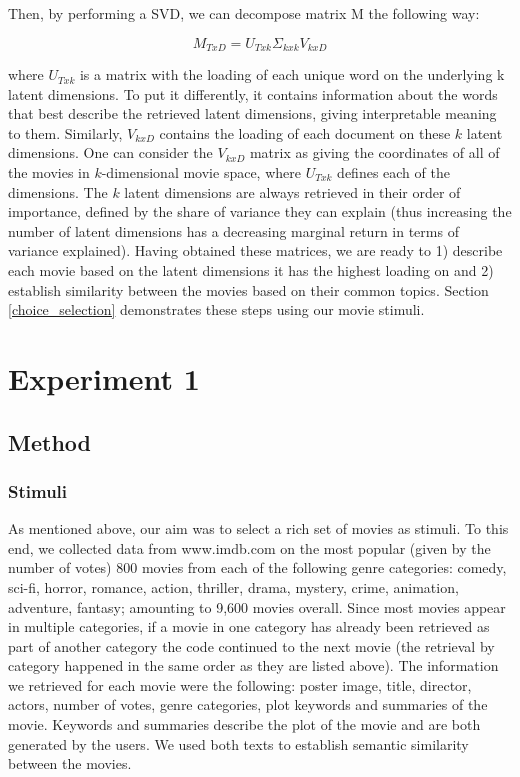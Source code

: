 \documentclass[11pt,a4paper]{article}
\begin{document}
Then, by performing a SVD, we can decompose matrix M the following way:

\begin{equation}
M_{TxD}=U_{Txk}\Sigma_{kxk}V_{kxD}
\label{eq:1}
\end{equation}

where $U_{Txk}$ is a matrix with the loading of each unique word on the underlying k latent dimensions. To put it differently, it contains information about the words that best describe the retrieved latent dimensions, giving interpretable meaning to them. Similarly, $V_{kxD}$ contains the loading of each document on these $k$ latent dimensions. One can consider the $V_{kxD}$ matrix as giving the coordinates of all of the movies in $k$-dimensional movie space, where $U_{Txk}$ defines each of the dimensions. The $k$ latent dimensions are always retrieved in their order of importance, defined by the share of variance they can explain (thus increasing the number of latent dimensions has a decreasing marginal return in terms of variance explained). Having obtained these matrices, we are ready to 1) describe each movie based on the latent dimensions it has the highest loading on and 2) establish similarity between the movies based on their common topics. Section \ref{choice_selection} demonstrates these steps using our movie stimuli.


\section{Experiment 1} 

\subsection{Method} \label{method_1}

\subsubsection{Stimuli}

As mentioned above, our aim was to select a rich set of movies as stimuli. To this end, we collected data from www.imdb.com on the most popular (given by the number of votes) 800 movies from each of the following genre categories: comedy, sci-fi, horror, romance, action, thriller, drama, mystery, crime, animation, adventure, fantasy; amounting to 9,600 movies overall. Since most movies appear in multiple categories, if a movie in one category has already been retrieved as part of another category the code continued to the next movie (the retrieval by category happened in the same order as they are listed above). The information we retrieved for each movie were the following: poster image, title, director, actors, number of votes, genre categories, plot keywords and summaries of the movie. Keywords and summaries describe the plot of the movie and are both generated by the users. We used both texts to establish semantic similarity between the movies.
\end{document}
